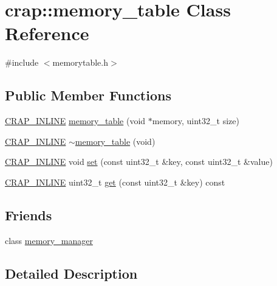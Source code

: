 \hypertarget{classcrap_1_1memory__table}{}\section{crap\+:\+:memory\+\_\+table Class Reference}
\label{classcrap_1_1memory__table}


{\ttfamily \#include $<$memorytable.\+h$>$}

\subsection*{Public Member Functions}
\begin{DoxyCompactItemize}
\item 
\hyperlink{config__x86_8h_a5a40526b8d842e7ff731509998bb0f1c}{C\+R\+A\+P\+\_\+\+I\+N\+L\+I\+N\+E} \hyperlink{classcrap_1_1memory__table_a36a58b0a3a584372ab689ccc4dd220ce}{memory\+\_\+table} (void $\ast$memory, uint32\+\_\+t size)
\item 
\hyperlink{config__x86_8h_a5a40526b8d842e7ff731509998bb0f1c}{C\+R\+A\+P\+\_\+\+I\+N\+L\+I\+N\+E} \hyperlink{classcrap_1_1memory__table_a69ac77f6f1e3000a95d0b37aca33b702}{$\sim$memory\+\_\+table} (void)
\item 
\hyperlink{config__x86_8h_a5a40526b8d842e7ff731509998bb0f1c}{C\+R\+A\+P\+\_\+\+I\+N\+L\+I\+N\+E} void \hyperlink{classcrap_1_1memory__table_a58222ecf35b20add743a93cdf3cb29b5}{set} (const uint32\+\_\+t \&key, const uint32\+\_\+t \&value)
\item 
\hyperlink{config__x86_8h_a5a40526b8d842e7ff731509998bb0f1c}{C\+R\+A\+P\+\_\+\+I\+N\+L\+I\+N\+E} uint32\+\_\+t \hyperlink{classcrap_1_1memory__table_a7941a3696642176ac928536bd0a0ff42}{get} (const uint32\+\_\+t \&key) const 
\end{DoxyCompactItemize}
\subsection*{Friends}
\begin{DoxyCompactItemize}
\item 
class \hyperlink{classcrap_1_1memory__table_a242c93ac6853d673bc3e068a57510842}{memory\+\_\+manager}
\end{DoxyCompactItemize}


\subsection{Detailed Description}


